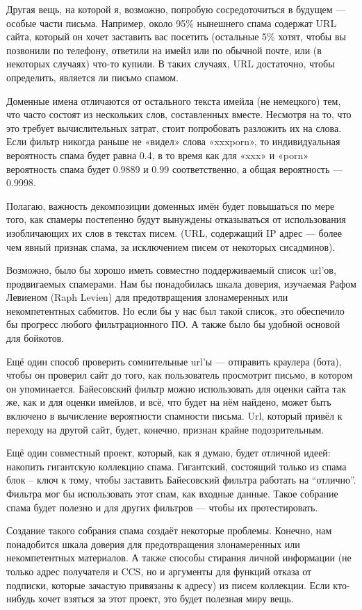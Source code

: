 \documentclass[ebook,12pt,oneside,openany]{memoir}
\begin{document}
Другая вещь, на которой я, возможно, попробую сосредоточиться в
будущем — особые части письма. Например, около 95\% нынешнего спама
содержат URL сайта, который он хочет заставить вас посетить (остальные
5\% хотят, чтобы вы позвонили по телефону, ответили на имейл или по
обычной почте, или (в некоторых случаях) что-то купили. В таких
случаях, URL достаточно, чтобы определить, является ли письмо спамом.

Доменные имена отличаются от остального текста имейла (не немецкого)
тем, что часто состоят из нескольких слов, составленных вместе.
Несмотря на то, что это требует вычислительных затрат, стоит
попробовать разложить их на слова. Если фильтр никогда раньше не
«видел» слова «xxxporn», то индивидуальная вероятность спама будет
равна 0.4, в то время как для «xxx» и «porn» вероятность спама будет
0.9889 и 0.99 соответственно, а общая вероятность — 0.9998.

Полагаю, важность декомпозиции доменных имён будет повышаться по мере
того, как спамеры постепенно будут вынуждены отказываться от
использования изобличающих их слов в текстах писем. (URL, содержащий
IP адрес — более чем явный признак спама, за исключением писем от
некоторых сисадминов).

Возможно, было бы хорошо иметь совместно поддерживаемый список url’ов,
продвигаемых спамерами. Нам бы понадобилась шкала доверия, изучаемая
Рафом Левиеном (Raph Levien) для предотвращения злонамеренных или
некомпетентных сабмитов. Но если бы у нас был такой список, это
обеспечило бы прогресс любого фильтрационного ПО. А также было бы
удобной основой для бойкотов.

Ещё один способ проверить сомнительные url’ы — отправить краулера
(бота), чтобы он проверил сайт до того, как пользователь просмотрит
письмо, в котором он упоминается. Байесовский фильтр можно
использовать для оценки сайта так же, как и для оценки имейлов, и всё,
что будет на нём найдено, может быть включено в вычисление вероятности
спамности письма. Url, который привёл к переходу на другой сайт,
будет, конечно, признан крайне подозрительным.

Ещё один совместный проект, который, как я думаю, будет отличной
идеей: накопить гигантскую коллекцию спама. Гигантский, состоящий
только из спама блок – ключ к тому, чтобы заставить Байесовский
фильтра работать на “отлично”. Фильтра мог бы использовать этот спам,
как входные данные. Такое собрание спама будет полезно и для других
фильтров — чтобы их протестировать.

Создание такого собрания спама создаёт некоторые проблемы. Конечно,
нам понадобится шкала доверия для предотвращения злонамеренных или
некомпетентных материалов. А также способы стирания личной информации
(не только адрес получателя и CCS, но и аргументы для функций отказа
от подписки, которые зачастую привязаны к адресу) из писем коллекции.
Если кто-нибудь хочет взяться за этот проект, это будет полезная миру
вещь.
\end{document}
